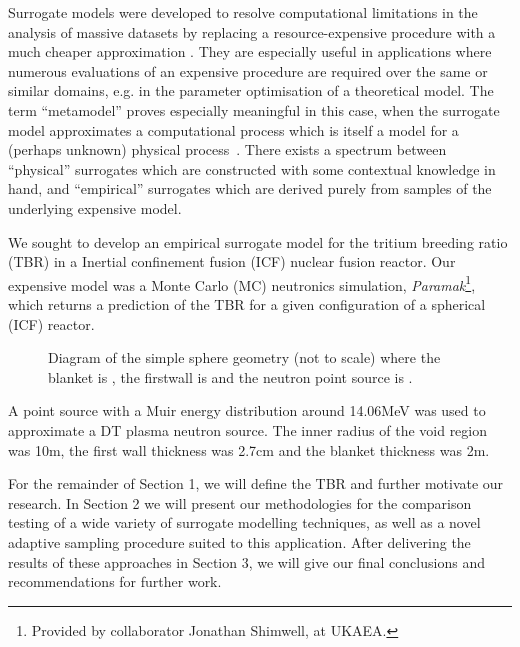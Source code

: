 Surrogate models were developed to resolve computational limitations in the analysis of massive datasets by replacing a resource-expensive procedure with a much cheaper approximation
\cite{Sondergaard2003}. They are especially useful in applications where
numerous evaluations of an expensive procedure are required over the same or
similar domains, e.g. in the parameter optimisation of a theoretical model. The
term ``metamodel'' proves especially meaningful in this case, when the surrogate
model approximates a computational process which is itself a model for a
(perhaps unknown) physical process~\cite{Myers2002}. There exists a spectrum
between ``physical'' surrogates which are constructed with some contextual
knowledge in hand, and ``empirical'' surrogates which are derived purely from
samples of the underlying expensive model.

We sought to develop an empirical surrogate model for the tritium breeding ratio (TBR) in a Inertial confinement fusion (ICF) nuclear fusion reactor. Our expensive model was a Monte Carlo (MC) neutronics simulation, \textit{Paramak}\footnote{Provided by collaborator Jonathan Shimwell, at UKAEA.}, which returns a prediction of the TBR for a given configuration of a spherical (ICF) reactor.

\begin{figure}[!ht]
  \centering

    \caption{Diagram of the simple sphere geometry (not to scale) where the blanket is , the firstwall is  and the neutron point source is .}
    \label{fig:model_diagram}
\end{figure}

A point source with a Muir energy distribution \cite{openmcmuir} around 14.06MeV was used to approximate a DT plasma neutron source. 
The inner radius of the void region was 10m, the first wall thickness was 2.7cm and the blanket thickness was 2m.

For the remainder of Section 1, we will define the TBR and further motivate our research. In Section 2 we will present our methodologies for the comparison testing of a wide variety of surrogate modelling techniques, as well as a novel adaptive sampling procedure suited to this application. After delivering the results of these approaches in Section 3, we will give our final conclusions and recommendations for further work.

